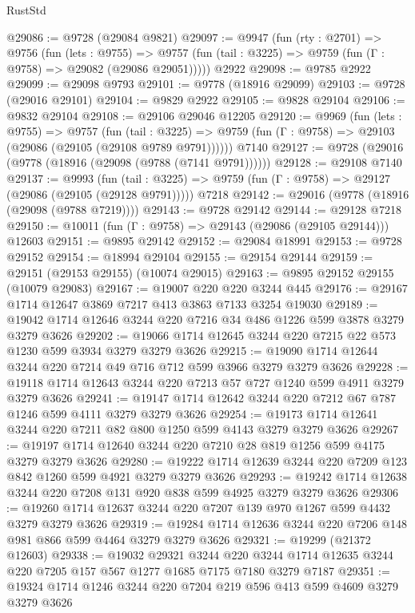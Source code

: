 \begin{lexlean}{RustStd}
\begin{coremodule}
{\begin{coremodule}
{{{{{{{{{{{{{{{{{{{{{{{{{{@29086 := @9728 (@29084 @9821)
@29097 := @9947
    (fun (rty : @2701) =>
    @9756
      (fun (lets : @9755) =>
      @9757 (fun (tail : @3225) => @9759 (fun (Γ : @9758) => @29082 (@29086 @29051)))))
    @2922
@29098 := @9785 @2922
@29099 := @29098 @9793
@29101 := @9778 (@18916 @29099)
@29103 := @9728 (@29016 @29101)
@29104 := @9829 @2922
@29105 := @9828 @29104
@29106 := @9832 @29104
@29108 := @29106 @29046 @12205
@29120 := @9969
    (fun (lets : @9755) =>
    @9757
      (fun (tail : @3225) =>
      @9759 (fun (Γ : @9758) => @29103 (@29086 (@29105 (@29108 @9789 @9791))))))
    @7140
@29127 := @9728 (@29016 (@9778 (@18916 (@29098 (@9788 (@7141 @9791))))))
@29128 := @29108 @7140
@29137 := @9993
    (fun (tail : @3225) => @9759 (fun (Γ : @9758) => @29127 (@29086 (@29105 (@29128 @9791)))))
    @7218
@29142 := @29016 (@9778 (@18916 (@29098 (@9788 @7219))))
@29143 := @9728 @29142
@29144 := @29128 @7218
@29150 := @10011 (fun (Γ : @9758) => @29143 (@29086 (@29105 @29144))) @12603
@29151 := @9895 @29142
@29152 := @29084 @18991
@29153 := @9728 @29152
@29154 := @18994 @29104
@29155 := @29154 @29144
@29159 := @29151 (@29153 @29155) (@10074 @29015)
@29163 := @9895 @29152 @29155 (@10079 @29083)
@29167 := @19007 @220 @220 @3244 @445
@29176 := @29167 @1714 @12647 @3869 @7217 @413 @3863 @7133 @3254 @19030
@29189 := @19042 @1714 @12646 @3244 @220 @7216 @34 @486 @1226 @599 @3878 @3279 @3279 @3626
@29202 := @19066 @1714 @12645 @3244 @220 @7215 @22 @573 @1230 @599 @3934 @3279 @3279 @3626
@29215 := @19090 @1714 @12644 @3244 @220 @7214 @49 @716 @712 @599 @3966 @3279 @3279 @3626
@29228 := @19118 @1714 @12643 @3244 @220 @7213 @57 @727 @1240 @599 @4911 @3279 @3279 @3626
@29241 := @19147 @1714 @12642 @3244 @220 @7212 @67 @787 @1246 @599 @4111 @3279 @3279 @3626
@29254 := @19173 @1714 @12641 @3244 @220 @7211 @82 @800 @1250 @599 @4143 @3279 @3279 @3626
@29267 := @19197 @1714 @12640 @3244 @220 @7210 @28 @819 @1256 @599 @4175 @3279 @3279 @3626
@29280 := @19222 @1714 @12639 @3244 @220 @7209 @123 @842 @1260 @599 @4921 @3279 @3279 @3626
@29293 := @19242 @1714 @12638 @3244 @220 @7208 @131 @920 @838 @599 @4925 @3279 @3279 @3626
@29306 := @19260 @1714 @12637 @3244 @220 @7207 @139 @970 @1267 @599 @4432 @3279 @3279 @3626
@29319 := @19284 @1714 @12636 @3244 @220 @7206 @148 @981 @866 @599 @4464 @3279 @3279 @3626
@29321 := @19299 (@21372 @12603)
@29338 := @19032
    @29321
    @3244
    @220
    @3244
    @1714
    @12635
    @3244
    @220
    @7205
    @157
    @567
    @1277
    @1685
    @7175
    @7180
    @3279
    @7187
@29351 := @19324 @1714 @1246 @3244 @220 @7204 @219 @596 @413 @599 @4609 @3279 @3279 @3626
}}}}}}}}}}}}}}}}}}}}}}}}}}
\end{coremodule}}
\end{coremodule}
\end{lexlean}
